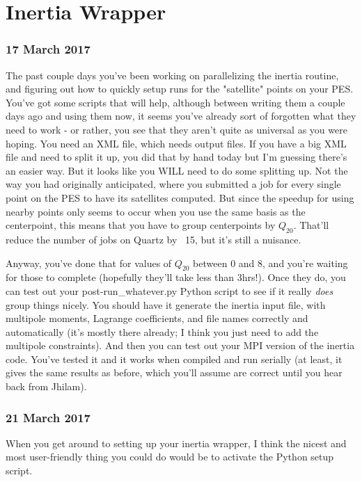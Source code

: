 \chapter{Inertia Wrapper}
\maketitle

\subsection*{17 March 2017}
The past couple days you've been working on parallelizing the inertia routine, and figuring out how to quickly setup runs for the "satellite" points on your PES. You've got some scripts that will help, although between writing them a couple days ago and using them now, it seems you've already sort of forgotten what they need to work - or rather, you see that they aren't quite as universal as you were hoping. You need an XML file, which needs output files. If you have a big XML file and need to split it up, you did that by hand today but I'm guessing there's an easier way. But it looks like you WILL need to do some splitting up. Not the way you had originally anticipated, where you submitted a job for every single point on the PES to have its satellites computed. But since the speedup for using nearby points only seems to occur when you use the same basis as the centerpoint, this means that you have to group centerpoints by $Q_{20}$. That'll reduce the number of jobs on Quartz by ~15, but it's still a nuisance.

Anyway, you've done that for values of $Q_{20}$ between 0 and 8, and you're waiting for those to complete (hopefully they'll take less than 3hrs!). Once they do, you can test out your post-run\_whatever.py Python script to see if it really \textit{does} group things nicely. You should have it generate the inertia input file, with multipole moments, Lagrange coefficients, and file names correctly and automatically (it's mostly there already; I think you just need to add the multipole constraints). And then you can test out your MPI version of the inertia code. You've tested it and it works when compiled and run serially (at least, it gives the same results as before, which you'll assume are correct until you hear back from Jhilam).

\subsection*{21 March 2017}
When you get around to setting up your inertia wrapper, I think the nicest and most user-friendly thing you could do would be to activate the Python setup script.

